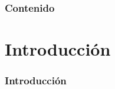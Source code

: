 \documentclass{beamer}
\begin{document}
\begin{frame}
\frametitle{Contenido}
\setcounter{tocdepth}{1} %
\tableofcontents
\end{frame}

\section{Introducción}

\begin{frame}
\begin{center}
\Huge{\color{blue}{Introducción}}
\end{center}
\end{frame}

\begin{frame}
\frametitle{Introducción}
\end{frame}
\end{document}
